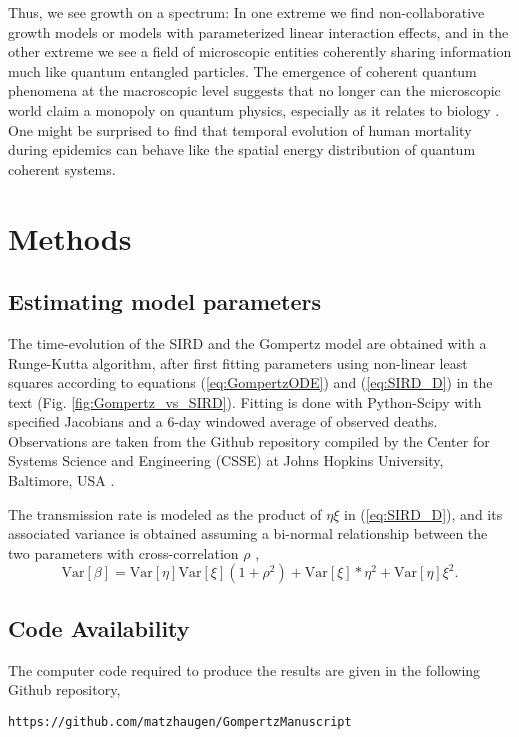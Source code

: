 \documentclass{article}
\begin{document}
Thus, we see growth on a spectrum: In one extreme we find non-collaborative growth models or models with parameterized linear interaction effects, and in the other extreme we see a field of microscopic entities coherently sharing information much like quantum entangled particles. The emergence of coherent quantum phenomena at the macroscopic level suggests that no longer can the microscopic world claim a monopoly on quantum physics, especially as it relates to biology \citep{lambert2013quantum}. One might be surprised to find that temporal evolution of human mortality during epidemics can behave like the spatial energy distribution of quantum coherent systems.


\newpage

\section*{Methods}

\subsection{Estimating model parameters}
The time-evolution of the SIRD and the Gompertz model are obtained with a Runge-Kutta algorithm, after first fitting parameters using non-linear least squares according to equations (\ref{eq:GompertzODE}) and (\ref{eq:SIRD_D}) in the text (Fig. \ref{fig:Gompertz_vs_SIRD}). Fitting is done with Python-Scipy with specified Jacobians and a 6-day windowed average of observed deaths. Observations are taken from the Github repository compiled by the Center for Systems Science and Engineering (CSSE) at Johns Hopkins University, Baltimore, USA \citep{dong2020interactive}. 

The transmission rate is modeled as the product of $\eta \xi$ in (\ref{eq:SIRD_D}), and its associated variance is obtained assuming a bi-normal relationship between the two parameters with cross-correlation $\rho$ \citep{nadarajah2016distribution},
\begin{equation}
\text{Var}[\beta] = \text{Var}[\eta] \text{Var}[\xi] (1 + \rho^2) + \text{Var}[\xi]*\eta^2 + \text{Var}[\eta] \xi^2.
\end{equation}

\subsection{Code Availability}
The computer code required to produce the results are given in the following Github repository,
\begin{verbatim}
https://github.com/matzhaugen/GompertzManuscript
\end{verbatim}
\end{document}

